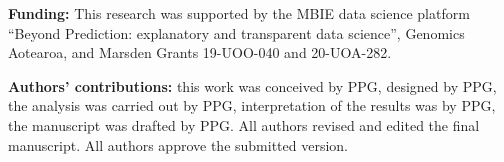 \documentclass[fleqn,10pt,doc,onecolumn]{SelfArx}%
\begin{document}
\noindent\textbf{Funding:} This research was supported by the MBIE data
science platform ``Beyond Prediction: explanatory and transparent data
science'', Genomics Aotearoa, and Marsden
Grants 19-UOO-040 and 20-UOA-282.

\noindent\textbf{Authors' contributions:} this work was conceived by 
PPG, designed by PPG, the analysis was carried out by PPG, interpretation of the results was by PPG,
the manuscript was drafted by  PPG.
All authors revised and edited the final manuscript. All authors approve the submitted version. 



\end{document}

